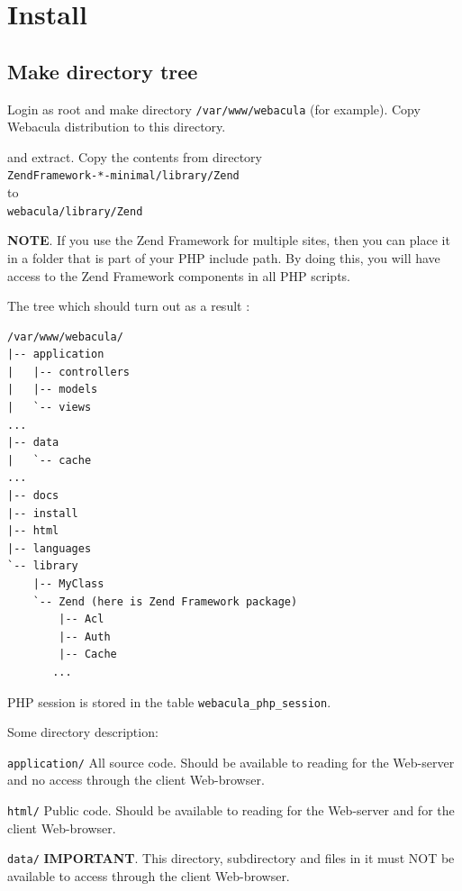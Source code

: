 \documentclass[10pt]{article}
\begin{document}
\section{Install}
\label{Install}



\subsection{Make directory tree}
\label{Install:Make directory tree}

Login as root and make directory \texttt{/var/www/webacula} (for example).
Copy Webacula distribution to this directory.

 and extract.
Copy the contents from directory \\
\texttt{ZendFramework-*-minimal/library/Zend} \\
to \\
\texttt{webacula/library/Zend}

\textbf{NOTE}. If you use the Zend Framework for multiple sites, then you can place it in a folder that is part of
your PHP include path. By doing this, you will have access to the Zend Framework components in all PHP scripts.

The tree which should turn out as a result :

\begin{verbatim}
/var/www/webacula/
|-- application
|   |-- controllers
|   |-- models
|   `-- views
...
|-- data
|   `-- cache
...
|-- docs
|-- install
|-- html
|-- languages
`-- library
    |-- MyClass
    `-- Zend (here is Zend Framework package)
        |-- Acl
        |-- Auth
        |-- Cache
       ...
\end{verbatim}

PHP session is stored in the table \texttt{webacula\_php\_session}.

Some directory description:

\texttt{application/}    All source code. Should be available to reading for the Web-server and
                  no access through the client Web-browser.

\texttt{html/}    Public code. Should be available to reading for the Web-server and for the client Web-browser.

\texttt{data/}    \textbf{IMPORTANT}. This directory, subdirectory and files in it
                  must NOT be available to access through the client Web-browser.
\end{document}
